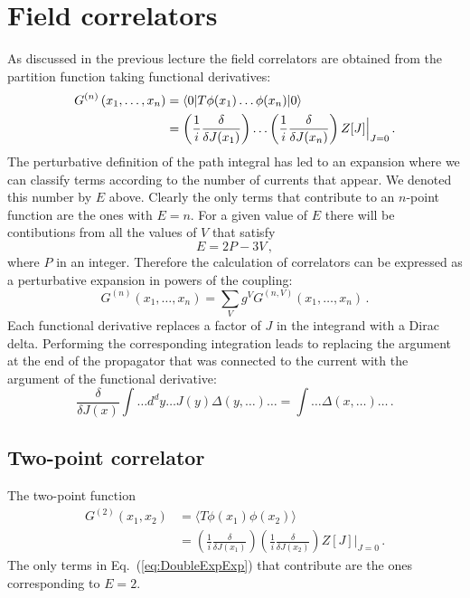 
\section{Field correlators}
\label{sec:field-correlators}

As discussed in the previous lecture the field correlators are
obtained from the partition function taking functional derivatives: 
\begin{align}
  \label{eq:CorrDefnPts}
  G^{(n)}\left(x_1, \ldots, x_n\right) 
  &=
    \langle 0 | T \phi(x_1) \ldots \phi(x_n) | 0 \rangle  \\
  \label{eq:CorrDerivGen}
  &= 
    \left(\frac{1}{i} \frac{\delta}{\delta J(x_1)}\right)
    \ldots
    \left(\frac{1}{i} \frac{\delta}{\delta J(x_n)}\right)
    Z[J]\Big|_{J=0} \, .
\end{align}
The perturbative definition of the path integral has led to an
expansion where we can classify terms according to the number of
currents that appear. We denoted this number by $E$ above. Clearly the
only terms that contribute to an $n$-point function are the ones with
$E=n$. For a given value of $E$ there will be contibutions from all
the values of $V$ that satisfy
\[
  E =2P- 3V\, ,
\]
where $P$ in an integer. Therefore the calculation of correlators can
be expressed as a perturbative expansion in powers of the coupling:
\begin{equation}
  \label{eq:CorrPertTh}
  G^{(n)}\left(x_1, \ldots, x_n\right) = 
  \sum_V g^V G^{(n,V)} \left(x_1, \ldots, x_n\right) \, .
\end{equation}
Each functional derivative replaces a factor
of $J$ in the integrand with a Dirac delta. Performing the
corresponding integration leads to replacing the argument at the end
of the propagator that was connected to the current with the argument
of the functional derivative:
\begin{equation}
  \label{eq:DeltaReplace}
  \frac{\delta}{\delta J(x)} \int \ldots d^dy \ldots J(y) \Delta(y,
  \ldots) \ldots =  \int \ldots \Delta(x,\ldots) \ldots\, .
\end{equation}

\subsection{Two-point correlator}
\label{sec:two-point-correlator}

 The two-point function
\begin{align}
  \label{eq:TwoPtOne}
  G^{(2)}(x_1,x_2) 
  &= 
    \langle T \phi(x_1) \phi(x_2) \rangle \\
  &= 
    \left(\frac{1}{i} \frac{\delta}{\delta J(x_1)}\right)
    \left(\frac{1}{i} \frac{\delta}{\delta J(x_2)}\right)
    Z[J]\Big|_{J=0} \, .
\end{align}
The only terms in Eq.~(\ref{eq:DoubleExpExp}) that contribute are the
ones corresponding to $E=2$. 

